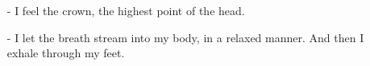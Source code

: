 \begin{frame}
\frametitle{}
\begin{columns}[c] %

\begin{itemize}
\item[-] I feel the crown, the highest point of the head.
 \item[-] I let the breath stream into my body, in a relaxed manner. And then I exhale through my feet.
\end{itemize}
\end{columns}
\end{frame}
